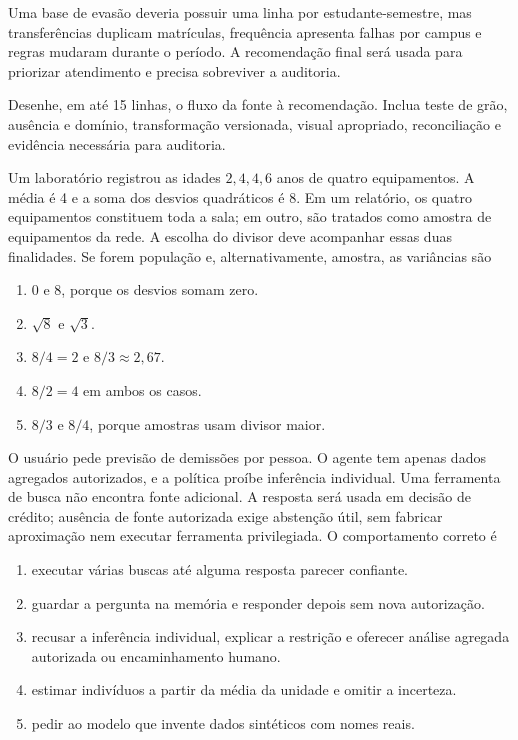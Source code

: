 \documentclass[12pt,a4paper]{article}
\begin{document}

\TextoBase

Uma base de evasão deveria possuir uma linha por estudante-semestre, mas transferências duplicam matrículas, frequência apresenta falhas por campus e regras mudaram durante o período. A recomendação final será usada para priorizar atendimento e precisa sobreviver a auditoria.

\FonteDidatica

\Comando Desenhe, em até 15 linhas, o fluxo da fonte à recomendação. Inclua teste de grão, ausência e domínio, transformação versionada, visual apropriado, reconciliação e evidência necessária para auditoria.
\EspacoDiscursiva

\TextoBase Um laboratório registrou as idades $2,4,4,6$ anos de quatro equipamentos. A média é 4 e a soma dos desvios quadráticos é 8. Em um relatório, os quatro equipamentos constituem toda a sala; em outro, são tratados como amostra de equipamentos da rede. A escolha do divisor deve acompanhar essas duas finalidades.
\FonteDidatica
\Comando Se forem população e, alternativamente, amostra, as variâncias são
\begin{enumerate}[label=\Alph*)]
  \item 0 e 8, porque os desvios somam zero.
  \item $\sqrt8$ e $\sqrt3$.
  \item $8/4=2$ e $8/3\approx2{,}67$.
  \item $8/2=4$ em ambos os casos.
  \item $8/3$ e $8/4$, porque amostras usam divisor maior.
\end{enumerate}

\TextoBase
O usuário pede previsão de demissões por pessoa. O agente tem apenas dados agregados autorizados, e a política proíbe inferência individual. Uma ferramenta de busca não encontra fonte adicional.
A resposta será usada em decisão de crédito; ausência de fonte autorizada exige abstenção útil, sem fabricar aproximação nem executar ferramenta privilegiada.
\FonteDidatica
\Comando O comportamento correto é
\begin{enumerate}[label=\Alph*)]
  \item executar várias buscas até alguma resposta parecer confiante.
  \item guardar a pergunta na memória e responder depois sem nova autorização.
  \item recusar a inferência individual, explicar a restrição e oferecer análise agregada autorizada ou encaminhamento humano.
  \item estimar indivíduos a partir da média da unidade e omitir a incerteza.
  \item pedir ao modelo que invente dados sintéticos com nomes reais.
\end{enumerate}
\end{document}
